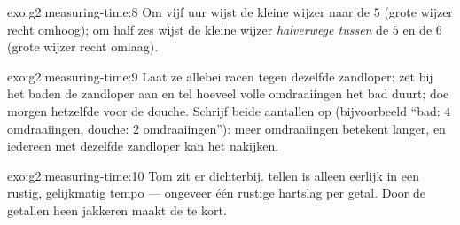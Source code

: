 \begin{solution}{exo:g2:measuring-time:8}
Om vijf uur wijst de kleine wijzer naar de $5$ (grote wijzer recht
omhoog); om half zes wijst de kleine wijzer \emph{halverwege tussen}
de $5$ en de $6$ (grote wijzer recht omlaag).
\end{solution}

\begin{solution}{exo:g2:measuring-time:9}
Laat ze allebei racen tegen dezelfde zandloper: zet bij het baden de
zandloper aan en tel hoeveel volle omdraaiingen het bad duurt; doe
morgen hetzelfde voor de douche. Schrijf beide aantallen op
(bijvoorbeeld ``bad: $4$ omdraaiingen, douche: $2$ omdraaiingen''):
meer omdraaiingen betekent langer, en iedereen met dezelfde zandloper
kan het nakijken.
\end{solution}

\begin{solution}{exo:g2:measuring-time:10}
Tom zit er dichterbij.  tellen is alleen eerlijk in een
rustig, gelijkmatig tempo --- ongeveer één rustige hartslag per
getal. Door de getallen heen jakkeren maakt de  te kort.
\end{solution}
